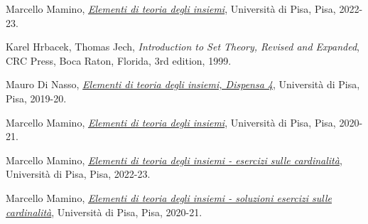 \documentclass[11pt,headheight=35pt]{scrartcl}
\begin{document}
\pagebreak
\begin{thebibliography}{9}

	Marcello Mamino,
	\href{https://ciovil.li/eti22/}{\textit{Elementi di teoria degli insiemi}},
	Università di Pisa, Pisa,
	2022-23.

	Karel Hrbacek, Thomas Jech,
	\textit{Introduction to Set Theory, Revised and Expanded},
	CRC Press, Boca Raton, Florida,
	3rd edition,
	1999.

	Mauro Di Nasso,
	\href{https://people.dm.unipi.it/dinasso/ETI/dispensa-04ss.pdf}{\textit{Elementi di teoria degli insiemi, Dispensa 4}},
	Università di Pisa, Pisa,
	2019-20.

	Marcello Mamino,
	\href{https://ciovil.li/eti20/}{\textit{Elementi di teoria degli insiemi}},
	Università di Pisa, Pisa,
	2020-21.

	Marcello Mamino,
	\href{https://ciovil.li/eti21/es-cardinalita.pdf}{\textit{Elementi di teoria degli insiemi - esercizi sulle cardinalità}},
	Università di Pisa, Pisa,
	2022-23.

	Marcello Mamino,
	\href{https://ciovil.li/eti20/sol01.pdf}{\textit{Elementi di teoria degli insiemi - soluzioni esercizi sulle cardinalità}},
	Università di Pisa, Pisa,
	2020-21.

\end{thebibliography}
\end{document}
